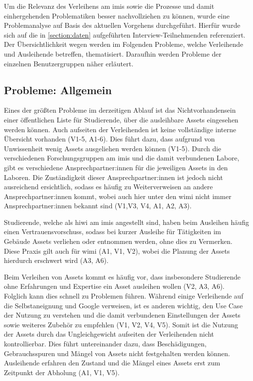Um die Relevanz des Verleihens am \ac{imis} sowie die Prozesse und damit einhergehenden
Problematiken besser nachvollziehen zu können, wurde eine Problemanalyse auf Basis des aktuellen
Vorgehens durchgeführt. Hierfür wurde sich auf die in \ref{section:daten} aufgeführten
Interview-Teilnehmenden referenziert.  Der Übersichtlichkeit wegen werden im Folgenden Probleme,
welche Verleihende und Ausleihende betreffen, thematisiert. Daraufhin werden Probleme der einzelnen
Benutzergruppen näher erläutert. 

\subsection{Probleme: Allgemein}
\label{section:probleme-allgemein}
Eines der größten Probleme im derzeitigen Ablauf ist das Nichtvorhandensein einer öffentlichen Liste
für Studierende, über die ausleihbare Assets eingesehen werden können. Auch aufseiten der
Verleihenden ist keine vollständige interne Übersicht vorhanden (V1-5, A1-6). Dies führt dazu, dass
aufgrund von Unwissenheit wenig Assets ausgeliehen werden können (V1-5). Durch die verschiedenen
Forschungsgruppen am \ac{imis} und die damit verbundenen Labore, gibt es verschiedene
Ansprechpartner:innen für die jeweiligen Assets in den Laboren. Die Zuständigkeit dieser
Ansprechpartner:innen ist jedoch nicht ausreichend ersichtlich, sodass es häufig zu Weiterverweisen
an andere Ansprechpartner:innen kommt, wobei auch hier unter den \ac{wimi} nicht immer
Ansprechpartner:innen bekannt sind (V1,V3, V4, A1, A2, A3).

Studierende, welche als \ac{hiwi} am \ac{imis} angestellt sind, haben beim Ausleihen häufig einen
Vertrauensvorschuss, sodass bei kurzer Ausleihe für Tätigkeiten im Gebäude Assets verliehen oder
entnommen werden, ohne dies zu Vermerken. Diese Praxis gilt auch für \ac{wimi} (A1, V1, V2), wobei
die Planung der Assets hierdurch erschwert wird (A3, A6).

Beim Verleihen von Assets kommt es häufig vor, dass insbesondere Studierende ohne Erfahrungen und
Expertise ein Asset ausleihen wollen (V2, A3, A6). Folglich kann dies schnell zu Problemen führen.
Während einige Verleihende auf die Selbstaneignung und Google verweisen, ist es anderen wichtig, den
Use Case der Nutzung zu verstehen und die damit verbundenen Einstellungen der Assets sowie weiteres
Zubehör zu empfehlen (V1, V2, V4, V5). Somit ist die Nutzung der Assets durch das Ungleichgewicht
aufseiten der Verleihenden nicht kontrollierbar. Dies führt untereinander dazu, dass Beschädigungen,
Gebrauchsspuren und Mängel von Assets nicht festgehalten werden können. Ausleihende erfahren den
Zustand und die Mängel eines Assets erst zum Zeitpunkt der Abholung (A1, V1, V5).

